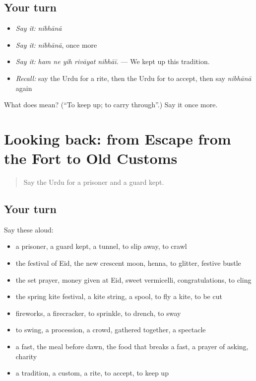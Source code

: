 \subsection*{Your turn}
\begin{itemize}
\raggedright
  \item \emph{Say it:} \emph{nibhānā}
  \item \emph{Say it:} \emph{nibhānā}, once more
  \item \emph{Say it:} \emph{ham ne yih rivāyat nibhāī.} — We kept up this tradition.
  \item \emph{Recall:} say the Urdu for a rite, then the Urdu for to accept, then say \emph{nibhānā} again
\end{itemize}

\begin{tcolorbox}[breakable,colback=teal!4,colframe=teal!35!black,title={Before you move on}]
What does  mean? (\textquotedblleft{}To keep up; to carry through\textquotedblright{}.) Say it once more.
\end{tcolorbox}
\section[(dialogue)]{Looking back: from Escape from the Fort to Old Customs}

\label{lesson:UR-R323-review-316-323}



\begin{quote}
Say the Urdu for a prisoner and a guard kept.
\end{quote}

\subsection*{Your turn}
Say these aloud:

\begin{itemize}
\raggedright
  \item a prisoner, a guard kept, a tunnel, to slip away, to crawl
  \item the festival of Eid, the new crescent moon, henna, to glitter, festive bustle
  \item the set prayer, money given at Eid, sweet vermicelli, congratulations, to cling
  \item the spring kite festival, a kite string, a spool, to fly a kite, to be cut
  \item fireworks, a firecracker, to sprinkle, to drench, to sway
  \item to swing, a procession, a crowd, gathered together, a spectacle
  \item a fast, the meal before dawn, the food that breaks a fast, a prayer of asking, charity
  \item a tradition, a custom, a rite, to accept, to keep up
\end{itemize}

